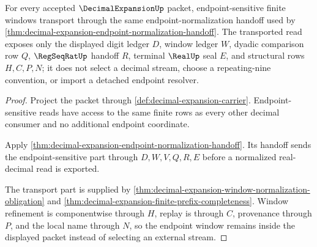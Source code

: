 \begin{theorem}
\label{thm:decimal-expansion-endpoint-window-transport}
For every accepted $\DecimalExpansionUp$ packet, endpoint-sensitive finite windows transport through the same endpoint-normalization handoff used by \autoref{thm:decimal-expansion-endpoint-normalization-handoff}. The transported read exposes only the displayed digit ledger $D$, window ledger $W$, dyadic comparison row $Q$, $\RegSeqRatUp$ handoff $R$, terminal $\RealUp$ seal $E$, and structural rows $H,C,P,N$; it does not select a decimal stream, choose a repeating-nine convention, or import a detached endpoint resolver.
\end{theorem}
\begin{proof}
Project the packet through \autoref{def:decimal-expansion-carrier}. Endpoint-sensitive reads have access to the same finite rows as every other decimal consumer and no additional endpoint coordinate.

Apply \autoref{thm:decimal-expansion-endpoint-normalization-handoff}. Its handoff sends the endpoint-sensitive part through $D,W,V,Q,R,E$ before a normalized real-decimal read is exported.

The transport part is supplied by \autoref{thm:decimal-expansion-window-normalization-obligation} and \autoref{thm:decimal-expansion-finite-prefix-completeness}. Window refinement is componentwise through $H$, replay is through $C$, provenance through $P$, and the local name through $N$, so the endpoint window remains inside the displayed packet instead of selecting an external stream.
\end{proof}

